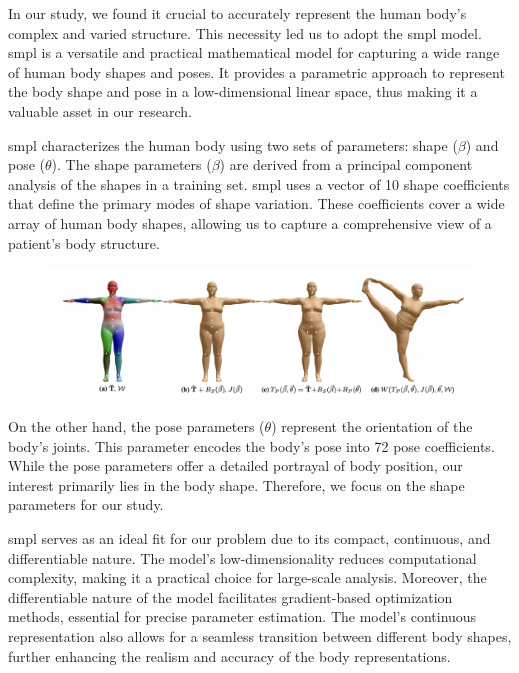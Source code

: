 In our study, we found it crucial to accurately represent the human body's
complex and varied structure. This necessity led us to adopt the \gls{smpl}
model. \gls{smpl} is a versatile and practical mathematical model for capturing
a wide range of human body shapes and poses. It provides a parametric approach
to represent the body shape and pose in a low-dimensional linear space, thus
making it a valuable asset in our research.

\gls{smpl} characterizes the human body using two sets of parameters: shape ($\beta$)
and pose ($\theta$). The shape parameters ($\beta$) are derived from a
principal component analysis of the shapes in a training set. \gls{smpl} uses a
vector of 10 shape coefficients that define the primary modes of shape
variation. These coefficients cover a wide array of human body shapes, allowing
us to capture a comprehensive view of a patient's body structure.

\begin{figure}[H]
    \centering
    \includegraphics[width=\textwidth]{files/SMPL_formulation}
\end{figure}

On the other hand, the pose parameters ($\theta$) represent the orientation of
the body's joints. This parameter encodes the body's pose into 72 pose
coefficients. While the pose parameters offer a detailed portrayal of body
position, our interest primarily lies in the body shape. Therefore, we focus on
the shape parameters for our study.

\gls{smpl} serves as an ideal fit for our problem due to its compact, continuous, and
differentiable nature. The model's low-dimensionality reduces computational
complexity, making it a practical choice for large-scale analysis. Moreover,
the differentiable nature of the model facilitates gradient-based optimization
methods, essential for precise parameter estimation. The model's continuous
representation also allows for a seamless transition between different body
shapes, further enhancing the realism and accuracy of the body representations.

